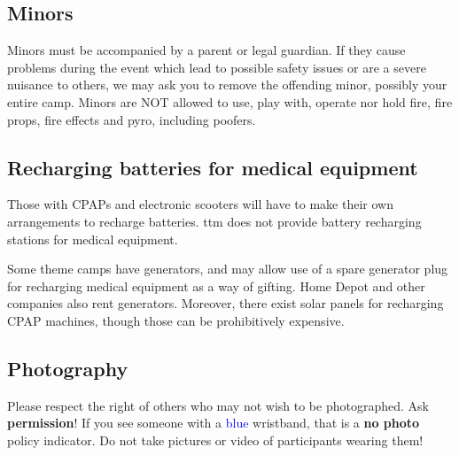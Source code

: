 


\subsection*{Minors}
Minors must be accompanied by a parent or legal guardian. If they cause problems during the event which lead to possible safety issues or are a severe nuisance to others, we may ask you to remove the offending minor, possibly your entire camp. Minors are NOT allowed to use, play with, operate nor hold fire, fire props, fire effects and pyro, including poofers.  


\subsection*{Recharging batteries for medical equipment}
Those with CPAPs and electronic scooters will have to make their own arrangements to recharge batteries.  \gls{ttm} does not provide battery recharging stations for medical equipment.

Some theme camps have generators, and may allow use of a spare generator plug for recharging medical equipment as a way of \gls{gifting}.  Home Depot and other companies also rent generators.  Moreover, there exist solar panels for recharging CPAP machines, though those can be prohibitively expensive.

\subsection*{Photography}
Please respect the right of others who may not wish to be photographed. Ask \textbf{permission}! If you see someone with a \textcolor{blue}{blue} wristband, that is a \textbf{no photo} policy indicator. 
Do not take pictures or video of participants wearing them! 

